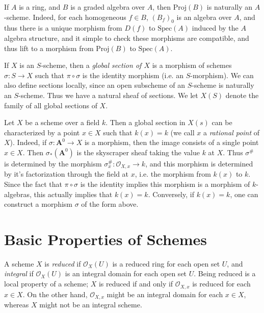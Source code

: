 \begin{example}
    If $A$ is a ring, and $B$ is a graded algebra over $A$, then $\text{Proj}(B)$ is naturally an $A$-scheme. Indeed, for each homogeneous $f \in B$, $(B_f)_0$ is an algebra over $A$, and thus there is a unique morphism from $D(f)$ to $\text{Spec}(A)$ induced by the $A$ algebra structure, and it simple to check these morphisms are compatible, and thus lift to a morphism from $\text{Proj}(B)$ to $\text{Spec}(A)$.
\end{example}

If $X$ is an $S$-scheme, then a \emph{global section of $X$} is a morphism of schemes $\sigma: S \to X$ such that $\pi \circ \sigma$ is the identity morphism (i.e. an $S$-morphism). We can also define sections locally, since an open subscheme of an $S$-scheme is naturally an $S$-scheme. Thus we have a natural sheaf of sections. We let $X(S)$ denote the family of all global sections of $X$.

\begin{example}
    Let $X$ be a scheme over a field $k$. Then a global section in $X(s)$ can be characterized by a point $x \in X$ such that $k(x) = k$ (we call $x$ a \emph{rational point} of $X$). Indeed, if $\sigma: \mathbf{A}^0 \to X$ is a morphism, then the image consists of a single point $x \in X$. Then $\sigma_*(\mathbf{A}^0)$ is the skyscraper sheaf taking the value $k$ at $X$. Thus $\sigma^{\#}$ is determined by the morphism $\sigma^{\#}_x: \mathcal{O}_{X,x} \to k$, and this morphism is determined by it's factorization through the field at $x$, i.e. the morphism from $k(x)$ to $k$. Since the fact that $\pi \circ \sigma$ is the identity implies this morphism is a morphism of $k$-algebras, this actually implies that $k(x) = k$. Conversely, if $k(x) = k$, one can construct a morphism $\sigma$ of the form above.
\end{example}





\section{Basic Properties of Schemes}

A scheme $X$ is \emph{reduced} if $\mathcal{O}_X(U)$ is a reduced ring for each open set $U$, and \emph{integral} if $\mathcal{O}_X(U)$ is an integral domain for each open set $U$. Being reduced is a local property of a scheme; $X$ is reduced if and only if $\mathcal{O}_{X,x}$ is reduced for each $x \in X$. On the other hand, $\mathcal{O}_{X,x}$ might be an integral domain for each $x \in X$, whereas $X$ might not be an integral scheme.

